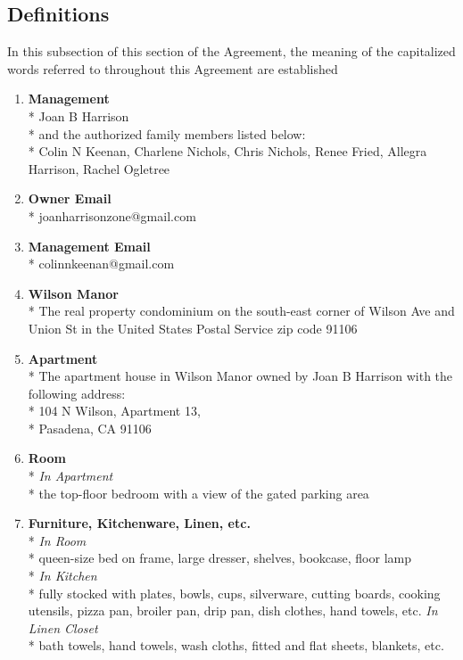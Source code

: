 \documentclass[12pt,letterpaper]{article}
\newcommand{\mom}{Joan B Harrison}
\newcommand{\ownermail}{Owner Email}
\newcommand{\management}{Management}
\newcommand{\myemail}{Management Email}
\newcommand{\condo}{Wilson Manor}
\newcommand{\apt}{Apartment}
\newcommand{\room}{Room}
\newcommand{\furniture}{Furniture, Kitchenware, Linen, etc.}
\begin{document}
\subsection{Definitions} \label{definitions}
	In this subsection of this section of the Agreement, the meaning of the capitalized words referred to throughout this Agreement are established
	\begin{multicols}{2}
		\begin{enumerate} 
			\item \textbf{\management{}}\\* \label{management}
				\noindent \mom{}\\*
				and the authorized family members listed below:\\*
				Colin N Keenan,
				Charlene Nichols,
				Chris Nichols,
				Renee Fried,
				Allegra Harrison,
				Rachel Ogletree
					
			\item \textbf{\ownermail{}}\\* \label{ownermail}
				joanharrisonzone@gmail.com

			\item \textbf{\myemail{}}\\* \label{myemail}
				colinnkeenan@gmail.com

			\item \textbf{\condo{}}\\* \label{condo}
				The real property condominium on the south-east corner of Wilson Ave and Union St in the United States Postal Service zip code 91106

			\item \textbf{\apt{}}\\* \label{apt}
				The apartment house in \condo{} owned by \mom{} with the following address:\\*
				104 N Wilson, \apt{} 13,\\* 
				Pasadena, CA  91106

			\item \textbf{\room{}}\\* \label{room}
				\textit{In \apt{}}\\*
				the top-floor bedroom with a view of the gated parking area

			\item \textbf{\furniture{}}\\* \label{furniture}
				\textit{In \room{}}\\*
				queen-size bed on frame, large dresser, shelves, bookcase, floor lamp\\*
				\textit{In Kitchen}\\*
				fully stocked with plates, bowls, cups, silverware, cutting boards, cooking utensils, pizza pan, broiler pan, drip pan, dish clothes, hand towels, etc.
				\textit{In Linen Closet}\\*
				bath towels, hand towels, wash cloths, fitted and flat sheets, blankets, etc.


\end{enumerate}
\end{multicols}
\end{document}
